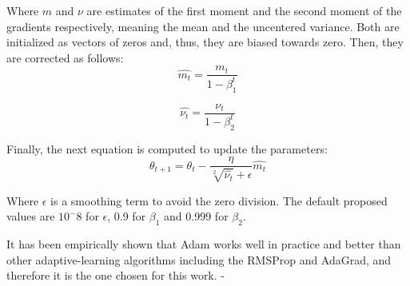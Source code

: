 Where $m$ and $\nu$ are estimates of the first moment and the second moment of the gradients respectively, meaning the mean and the uncentered variance. Both are initialized as vectors of zeros and, thus, they are biased towards zero. Then, they are corrected as follows:
\begin{equation}
\hat{m_t}=\frac{m_t}{1-\beta^t_1}
\end{equation}

\begin{equation}
\hat{\nu_t}=\frac{\nu_t}{1-\beta^t_2}
\end{equation}

Finally, the next equation is computed to update the parameters:
\begin{equation}
\theta_{t+1}=\theta_t-\frac{\eta}{\sqrt[2]{\hat{\nu_t}} + \epsilon} \hat{m_t} 
\end{equation}

Where $\epsilon$ is a smoothing term to avoid the zero division. The default proposed values are $10^-8$ for $\epsilon$, 0.9 for $\beta_1$ and 0.999 for $\beta_2$.


It has been empirically shown that Adam works well in practice and better than other adaptive-learning algorithms including the RMSProp and AdaGrad, and therefore it is the one chosen for this work.
-
